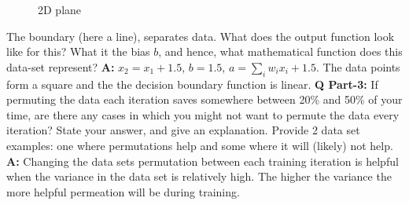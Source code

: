 \documentclass[main.tex]{subfiles}
\begin{document}
\begin{enumerate}
\begin{figure}
\caption{2D plane}
\label{fig:2}
\end{figure}
The boundary (here a line), separates data. What does the output function look like for this? What it the bias $b$, and hence, what mathematical function does this data-set represent? \textbf{A:} $x_2 = x_1 + 1.5$, $b = 1.5$, $a =\sum_i w_i x_{i} + 1.5$. The data points form a square and the the decision boundary function is linear. \textbf{Q Part-3:} If permuting the data each iteration saves somewhere between 20\% and 50\% of your time, are  there any cases in which you might not want to permute the data every iteration? State your answer, and give an explanation. Provide 2 data set examples: one where permutations help and some where it will (likely) not help. \textbf{A:} Changing the data sets permutation between each training iteration is helpful when the variance in the data set is relatively high. The higher the variance the more helpful permeation will be during training.

\end{enumerate}
\end{document}
